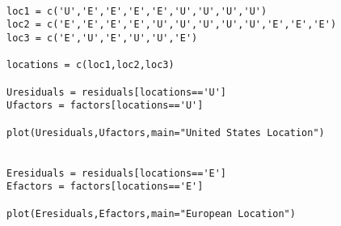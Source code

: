 \documentclass[11pt]{article}
\begin{document}
\begin{verbatim}

loc1 = c('U','E','E','E','E','U','U','U','U')
loc2 = c('E','E','E','E','U','U','U','U','U','E','E','E')
loc3 = c('E','U','E','U','U','E')

locations = c(loc1,loc2,loc3)

Uresiduals = residuals[locations=='U']
Ufactors = factors[locations=='U']

plot(Uresiduals,Ufactors,main="United States Location")


Eresiduals = residuals[locations=='E']
Efactors = factors[locations=='E']

plot(Eresiduals,Efactors,main="European Location")
\end{verbatim}
\end{document}
